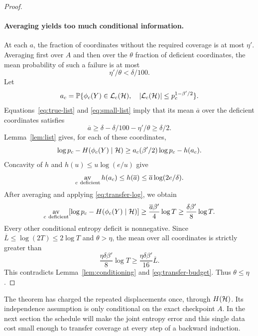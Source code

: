 \begin{proof}
\paragraph{Averaging yields too much conditional information.}
At each $a$, the fraction of coordinates without the required coverage
is at most $\eta'$. Averaging first over $A$ and then over the
$\theta$ fraction of deficient coordinates, the mean probability of
such a failure is at most
\[
 \eta'/\theta<\delta/100.
\]
Let
\[
 a_c=\mathbb P\{\phi_c(Y)\in\mathcal L_c(\mathcal H),\quad
                  |\mathcal L_c(\mathcal H)|\le p_c^{1-\beta'/2}\}.
\]
Equations~\eqref{eq:true-list} and \eqref{eq:small-list} imply that its
mean $\overline a$ over the deficient coordinates satisfies
\[
 \overline a\ge\delta-\delta/100-\eta'/\theta\ge\delta/2.
\]
Lemma~\ref{lem:list} gives, for each of these coordinates,
\[
 \log p_c-H(\phi_c(Y)\mid\mathcal H)
 \ge a_c(\beta'/2)\log p_c-h(a_c).
\]
Concavity of $h$ and $h(u)\le u\log(e/u)$ give
\[
 \mathop{\mathrm{av}}_{c\ \mathrm{deficient}}h(a_c)
 \le h(\overline a)
 \le\overline a\log(2e/\delta).
\]
After averaging and applying \eqref{eq:transfer-log}, we obtain
\[
 \mathop{\mathrm{av}}_{c\ \mathrm{deficient}}
 [\log p_c-H(\phi_c(Y)\mid\mathcal H)]
 \ge\frac{\overline a\beta'}4\log T
 \ge\frac{\delta\beta'}8\log T.
\]
Every other conditional entropy deficit is nonnegative. Since
$\overline L\le\log(2T)\le2\log T$ and $\theta>\eta$, the mean over
all coordinates is strictly greater than
\[
 \frac{\eta\delta\beta'}8\log T
 \ge\frac{\eta\delta\beta'}{16}\overline L.
\]
This contradicts Lemma~\ref{lem:conditioning} and
\eqref{eq:transfer-budget}. Thus $\theta\le\eta$.
\end{proof}


The theorem has charged the repeated displacements once, through
$H(\mathcal H)$. Its independence assumption is only conditional on the exact
checkpoint $A$. In the next section the schedule will make the joint
entropy error and this single data cost small enough to transfer coverage
at every step of a backward induction.
